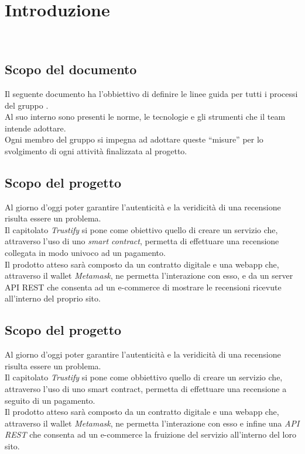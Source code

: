 \section{Introduzione}\
\subsection{Scopo del documento}
Il seguente documento ha l'obbiettivo di definire le linee guida per tutti i
processi del gruppo \groupName. \\ Al suo interno sono presenti le norme, le
tecnologie e gli strumenti che il team intende adottare. \\ Ogni membro del
gruppo si impegna ad adottare queste “misure” per lo svolgimento di ogni
attività finalizzata al progetto.

\subsection{Scopo del progetto}
Al giorno d'oggi poter garantire l'autenticità e la veridicità di una
recensione risulta essere un problema. \\ Il capitolato \textit{Trustify} si
pone come obiettivo quello di creare un servizio che, attraverso l'uso di uno
\textit{smart contract}, permetta di effettuare una recensione collegata in
modo univoco ad un pagamento. \\ Il prodotto atteso sarà composto da un
contratto digitale e una webapp che, attraverso il wallet \textit{Metamask}, ne
permetta l'interazione con esso, e da un server API REST che consenta ad un
e-commerce di mostrare le recensioni ricevute all'interno del proprio sito.
    \subsection{Scopo del progetto}
    Al giorno d’oggi poter garantire l’autenticità e la veridicità di una recensione risulta essere un problema. \\
    Il capitolato \textit{Trustify} si pone come obbiettivo quello di creare un servizio che, attraverso l’uso di uno smart contract, permetta di effettuare una recensione a seguito di un pagamento. \\
    Il prodotto atteso sarà composto da un contratto digitale e una webapp che, attraverso il wallet \textit{Metamask}, ne permetta l’interazione con esso e infine una \textit{API REST} che consenta ad un e-commerce la fruizione del servizio all’interno del loro sito.    

